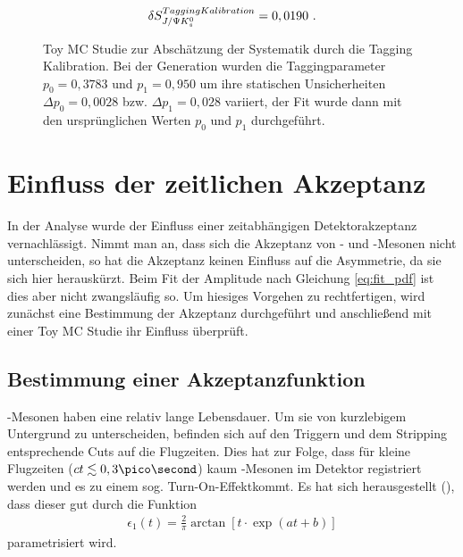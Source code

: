 \begin{align}
\delta S_{J/\Psi K_s^0}^{Tagging Kalibration} = 0,0190 \ .
\end{align}

\begin{figure}[hptb]
\caption{Toy MC Studie zur Abschätzung der Systematik durch die Tagging Kalibration. Bei der Generation wurden die Taggingparameter $p_0=0,3783$ und $p_1=0,950$ um ihre statischen Unsicherheiten $\Delta p_0 = 0,0028$ bzw. $\Delta p_1 = 0,028$ variiert, der Fit wurde dann mit den ursprünglichen Werten $p_0$ und $p_1$ durchgeführt.}
\label{fig:toys_tag_calib}
\end{figure}



\section{Einfluss der zeitlichen Akzeptanz}
In der Analyse wurde der Einfluss einer zeitabhängigen Detektorakzeptanz vernachlässigt. Nimmt man an, dass sich die Akzeptanz von \Bd- und \Bdbar-Mesonen nicht unterscheiden, so hat die Akzeptanz keinen Einfluss auf die Asymmetrie, da sie sich hier herauskürzt. Beim Fit der Amplitude nach Gleichung \ref{eq:fit_pdf} ist dies aber nicht zwangsläufig so. Um hiesiges Vorgehen zu rechtfertigen, wird zunächst eine Bestimmung der Akzeptanz durchgeführt und anschließend mit einer Toy MC Studie ihr Einfluss überprüft.

\subsection{Bestimmung einer Akzeptanzfunktion} \label{kap:akzeptanz_bestimmung}
\Bd-Mesonen haben eine relativ lange Lebensdauer. Um sie von kurzlebigem Untergrund zu unterscheiden, befinden sich auf den Triggern und dem Stripping entsprechende Cuts auf die Flugzeiten. Dies hat zur Folge, dass für kleine Flugzeiten ($ct \lesssim 0,3\pico\second$) kaum \Bd-Mesonen im Detektor registriert werden und es zu einem sog. \glqq Turn-On-Effekt\grqq kommt. Es hat sich herausgestellt (\cite{lhcb-paper}), dass dieser gut durch die Funktion
\begin{align}
\epsilon_1(t) = \frac{2}{\pi}\arctan[t\cdot \exp(at+b)]
\end{align}
parametrisiert wird.

